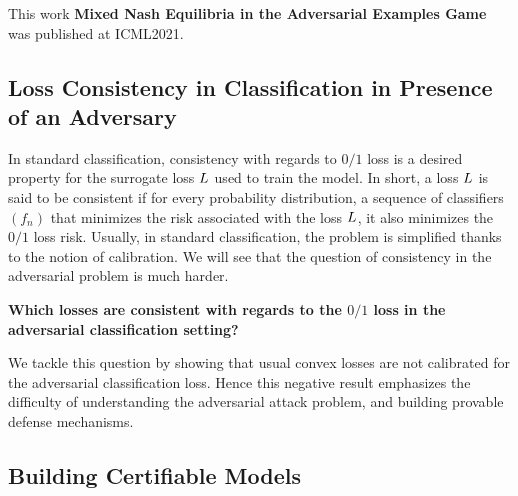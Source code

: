 This work \textbf{Mixed Nash Equilibria in the Adversarial Examples Game} was published at ICML2021.



\subsection{Loss Consistency in Classification in Presence of an Adversary}
In standard classification, consistency with regards to $0/1$ loss is a desired property for the surrogate loss $L$ used to train the model. In short, a loss $L$ is said to be consistent if for every probability distribution, a sequence of classifiers $(f_n)$ that minimizes the risk associated with the loss $L$, it also minimizes the $0/1$ loss risk. Usually, in standard classification, the problem is simplified thanks to the notion of calibration. We will see that the question of consistency in the adversarial problem is much harder. 
\medskip
\begin{tcolorbox}[colback=grund,colframe=rahmen,title=Question 2]
\textbf{Which losses are consistent with regards to the $0/1$ loss in the adversarial classification setting?}
\end{tcolorbox}
\medskip
We tackle this question by showing that usual convex losses are not calibrated for the adversarial classification loss. Hence this negative result emphasizes the difficulty of understanding the adversarial attack problem, and building provable defense mechanisms. 
\subsection{Building Certifiable Models}

